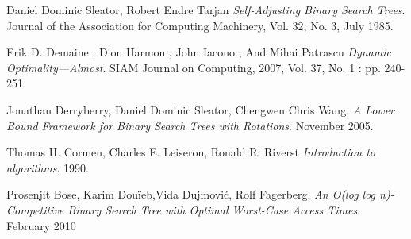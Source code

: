 \documentclass[declaration,shortabstract]{iithesis}
\newcounter{thm}[section]
\theoremstyle{thm}
\theoremstyle{remark}
\theoremstyle{plain}
\theoremstyle{plain}
\theoremstyle{plain}
\begin{document}
\begin{thebibliography}{references}

  Daniel Dominic Sleator,
  Robert Endre Tarjan 
  \emph{Self-Adjusting Binary Search Trees}.
  Journal of the Association for Computing Machinery, Vol. 32, No. 3, July 1985. 
  
 Erik D. Demaine
, Dion Harmon
, John Iacono
, And Mihai Patrascu
  \emph{Dynamic Optimality—Almost}.
  SIAM Journal on Computing, 2007, Vol. 37, No. 1 : pp. 240-251 
  
  Jonathan Derryberry,
  Daniel Dominic Sleator,
  Chengwen Chris Wang,
  \emph{A Lower Bound Framework for Binary Search Trees with Rotations}.
  November 2005.
  
  Thomas H. Cormen,
  Charles E. Leiseron,
  Ronald R. Riverst
  \emph{Introduction to algorithms}.
  1990.
  
  Prosenjit Bose, 
  Karim Douïeb,Vida Dujmović,
  Rolf Fagerberg,
  \emph{An O(log log n)-Competitive Binary Search Tree with Optimal Worst-Case Access Times}.
  February 2010
  \end{thebibliography}
\end{document}
